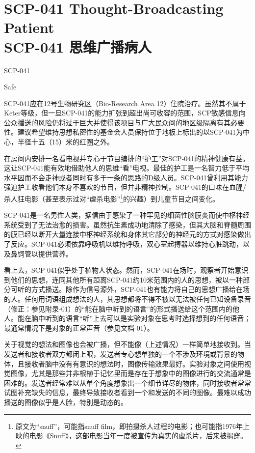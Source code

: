 \chapter[SCP-041 思维广播病人]{
    SCP-041 Thought-Broadcasting Patient\\
    SCP-041 思维广播病人
}

\label{chap:SCP-041}

SCP-041

Safe

SCP-041应在12号生物研究区（Bio-Research Area 12）住院治疗。虽然其不属于Keter等级，但一旦SCP-041的能力扩张到超出尚可收容的范围，SCP敏感信息向公众播送的风险仍将过于巨大并使得该项目与广大民众间的地区级隔离有其必要性。建议希望维持思想私密性的基金会人员保持位于地板上标出的以SCP-041为中心，半径十五（15）米的红圈之外。

在房间内安排一名看电视并专心于节目编排的“护工”对SCP-041的精神健康有益。这让SCP-041能有效地借助他人的思维“看”电视。最佳的护工是一名智力低于平均水平因而不会走神或者同时有多于一条的思路的D级人员。SCP-041曾利用其能力强迫护工收看他们本身不喜欢的节目，但并非精神控制。SCP-041的口味在血腥\slash 杀人狂电影（甚至表示过对“虐杀电影”\footnote{原文为“snuff”，可能指snuff film，即拍摄杀人过程的电影；也可能指1976年上映的电影《Snuff》，这部电影当年一度被宣传为真实的虐杀片，后来被揭穿。}的兴趣）到儿童节目之间变化。

SCP-041是一名男性人类，据信由于感染了一种罕见的细菌性脑膜炎而使中枢神经系统受到了无法治愈的损害。虽然抗生素成功地清除了感染，但其大脑和脊髓周围的膜已经以断开大量连接中枢神经系统和身体其它部分的神经元的方式对感染做出了反应。SCP-041必须依靠呼吸机以维持呼吸，双心室起搏器以维持心脏跳动，以及鼻饲管以提供营养。

看上去，SCP-041似乎处于植物人状态。然而，SCP-041在场时，观察者开始意识到他们的思想，连同其他所有距离SCP-041约10米范围内的人的思想，被以一种部分可听的方式播送。除作为信号源外，SCP-041也有能力将自己的思想广播给在场的人。任何用词语组成想法的人，其思想都将不得不被以无法被任何已知设备录音（修正：参见附录-01）的“能在脑中听到的语言”的形式播送给这个范围内的他人。能在脑中听到的语言“听”上去可以是实验对象在思考时选择想到的任何语音；最通常情况下是对象的正常声音（参见文档-01）。

关于视觉的想法和图像也会被广播，但不能像（上述情况）一样简单地接收到。当发送者和接收者双方都闭上眼，发送者专心想单独的一个不涉及环境或背景的物体，且接收者脑中没有有意识的想法时，图像传输效果最好。实验对象之间使用视觉图像，尤其是那些并非根植于记忆里而是存在于想象中的图像进行的交流通常是困难的。发送者经常难以从单个角度想象出一个细节详尽的物体，同时接收者常常试图补充缺失的信息，最终导致接收者看到一个和发送的不同的图像。最难以成功播送的图像似乎是人脸，特别是动态的。

